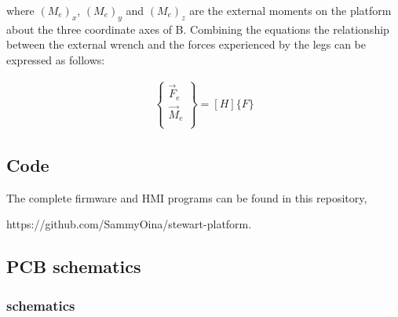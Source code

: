 where $(M_e)_x$, $(M_e)_y$ and $(M_e)_z$ are the external moments on the platform  about the three coordinate axes of B. Combining the equations the relationship between the external wrench and the forces experienced by the legs can be expressed as follows:
\begin{ceqn}
	\begin{align}
		\begin{Bmatrix}
			\vec{F}_e \\
			\vec{M}_e \\
		\end{Bmatrix} = [H]\{F\}
	\end{align}
\end{ceqn}
\clearpage
\subsection{Code}
The complete firmware and HMI programs can be found in this repository,

https://github.com/SammyOina/stewart-platform.
\clearpage

\subsection{PCB schematics}
\subsubsection{schematics}
